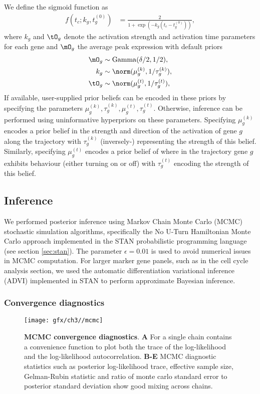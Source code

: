 We define the sigmoid function as
\begin{align}
	f(t_c;k_g,t^{(0)}_g) &= \frac{2}{1 + \exp\left(-k_g(t_c - t^{(0)}_g)\right)},
\end{align}
where $k_g$ and $\tO_g$ denote the activation strength and activation time parameters for each gene and $\mO_g$ the average peak expression
with default priors
\begin{align}
		\mO_g & \sim \mathrm{Gamma}(\delta / 2, 1 / 2), \\
		k_g & \sim \norm(\mu^{(k)}_g, 1 / \tau^{(k)}_g), \\
		\tO_g & \sim \norm(\mu^{(t)}_g, 1 / \tau^{(t)}_g),
\end{align}
If available, user-supplied prior beliefs can be encoded in these priors by specifying the parameters $\mu^{(k)}_g, \tau^{(k)}_g, \mu^{(t)}_g, \tau^{(t)}_g$. Otherwise, inference can be performed using uninformative hyperpriors on these parameters. Specifying $\mu^{(k)}_g$ encodes a prior belief in the strength and direction of the activation of gene $g$ along the trajectory with $\tau^{(k)}_g$ (inversely-) representing the strength of this belief. Similarly, specifying $\mu^{(t)}_g$ encodes a prior belief of where in the trajectory gene $g$ exhibits behaviour (either turning on or off) with $\tau^{(t)}_g$ encoding the strength of this belief.

\subsection{Inference}

We performed posterior inference using Markov Chain Monte Carlo (MCMC) stochastic simulation algorithms, specifically the No U-Turn Hamiltonian Monte Carlo approach \cite{homan2014no} implemented in the STAN probabilistic programming language \cite{carpenter2015stan} (see section \ref{sec:stan}). The parameter $\epsilon = 0.01$ is used to avoid numerical issues in MCMC computation. For larger marker gene panels, such as in the cell cycle analysis section, we used the automatic differentiation variational inference (ADVI) implemented in STAN to perform approximate Bayesian inference.


\subsubsection{Convergence diagnostics}

\begin{figure}
\centering
 \texttt{[image: gfx/ch3//mcmc]}
 \caption{\textbf{MCMC convergence diagnostics}. \textbf{A} For a single chain \sname contains a convenience function to plot both the trace of the log-likelihood and the log-likelihood autocorrelation. \textbf{B-E} MCMC diagnostic statistics such as posterior log-likelihood trace, effective sample size, Gelman-Rubin statistic and ratio of monte carlo standard error to posterior standard deviation show good mixing across chains.} \label{fig:mcmc}
 \end{figure}


